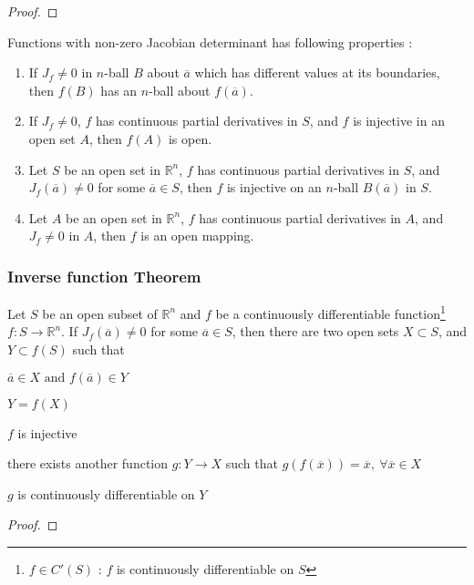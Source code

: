 \begin{theorem}
\end{theorem}
\begin{proof}
\end{proof}

\begin{commentary}
\begin{remark}[Properties]
	Functions with non-zero Jacobian determinant has following properties :
\begin{enumerate}
	\item If $J_f \ne 0$ in $n$-ball $B$ about $\overline{a}$ which has different values at its boundaries, then $f(B)$ has an $n$-ball about $f(\overline{a})$.
	\item If $J_f \ne 0$, $f$ has continuous partial derivatives in $S$, and $f$ is injective in an open set $A$, then $f(A)$ is open.
	\item Let $S$ be an open set in $\mathbb{R}^n$, $f$ has continuous partial derivatives in $S$, and $J_f(\overline{a}) \ne 0$ for some $\overline{a} \in S$, then $f$ is injective on an $n$-ball $B(\overline{a})$ in $S$.
	\item Let $A$ be an open set in $\mathbb{R}^n$, $f$ has continuous partial derivatives in $A$, and $J_f \ne 0$ in $A$, then $f$ is an open mapping.
\end{enumerate}
\end{remark}
\end{commentary}

\subsubsection{Inverse function Theorem}
\begin{theorem}
Let $S$ be an open subset of $\mathbb{R}^n$ and $f$ be a continuously differentiable function\footnote{$f \in C'(S)$ : $f$ is continuously differentiable on $S$} $f : S \to \mathbb{R}^n$. If $J_f(\overline{a}) \ne 0$ for some $\overline{a} \in S$, then there are two open sets $X \subset S$, and $Y \subset f(S)$ such that \begin{enumerate*} \item $\overline{a} \in X \text{ and } f(\overline{a}) \in Y$ \item $Y = f(X)$ \item $f$ is injective \item there exists another function $g : Y \to X$ such that $g(f(\overline{x})) = \overline{x},\ \forall \overline{x} \in X$ \item $g$ is continuously differentiable on $Y$ \end{enumerate*}
\end{theorem}
\begin{proof}
\end{proof}

